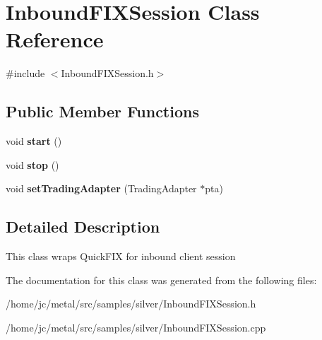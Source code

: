 \hypertarget{classInboundFIXSession}{}\section{Inbound\+F\+I\+X\+Session Class Reference}
\label{classInboundFIXSession}


{\ttfamily \#include $<$Inbound\+F\+I\+X\+Session.\+h$>$}

\subsection*{Public Member Functions}
\begin{DoxyCompactItemize}
\item 
\hypertarget{classInboundFIXSession_a18caf8d045f6e96c82ccc6bf166f7c49}{}void {\bfseries start} ()\label{classInboundFIXSession_a18caf8d045f6e96c82ccc6bf166f7c49}

\item 
\hypertarget{classInboundFIXSession_a07984db03c9b9ab49c045dddd4998cf6}{}void {\bfseries stop} ()\label{classInboundFIXSession_a07984db03c9b9ab49c045dddd4998cf6}

\item 
\hypertarget{classInboundFIXSession_aeedf9281afba1f8f8436e9f3a27a389f}{}void {\bfseries set\+Trading\+Adapter} (Trading\+Adapter $\ast$pta)\label{classInboundFIXSession_aeedf9281afba1f8f8436e9f3a27a389f}

\end{DoxyCompactItemize}


\subsection{Detailed Description}
This class wraps Quick\+F\+I\+X for inbound client session 

The documentation for this class was generated from the following files\+:\begin{DoxyCompactItemize}
\item 
/home/jc/metal/src/samples/silver/Inbound\+F\+I\+X\+Session.\+h\item 
/home/jc/metal/src/samples/silver/Inbound\+F\+I\+X\+Session.\+cpp\end{DoxyCompactItemize}
